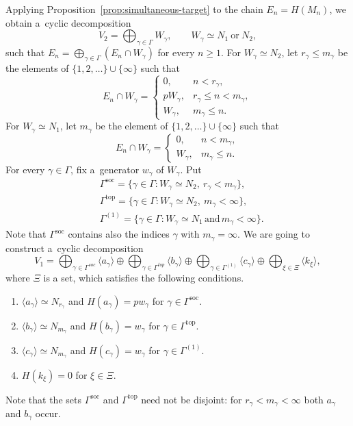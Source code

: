 \documentclass[11pt]{article}
\theoremstyle{definition}
\begin{document}
Applying Proposition~\ref{prop:simultaneous-target} to the chain
$E_n=H(M_n)$, we obtain a~cyclic decomposition
$$
V_2=\bigoplus_{\gamma\in\Gamma}W_\gamma,
\qquad W_\gamma\simeq N_1\ \text{or}\ N_2,
$$
such that $E_n=\bigoplus_{\gamma\in\Gamma}(E_n\cap W_\gamma)$
for every $n\geq1$.
For $W_\gamma\simeq N_2$, let $r_\gamma\leq m_\gamma$
be the elements of $\{1,2,\dots\}\cup\{\infty\}$ such that
$$
E_n\cap W_\gamma=
\begin{cases}
	0,&n<r_\gamma,\\
	pW_\gamma,&r_\gamma\leq n<m_\gamma,\\
	W_\gamma,&m_\gamma\leq n.
\end{cases}
$$
For $W_\gamma\simeq N_1$, let $m_\gamma$ be the element of $\{1,2,\dots\}\cup\{\infty\}$
such that
$$
E_n\cap W_\gamma=
\begin{cases}
	0,&n<m_\gamma,\\
	W_\gamma,&m_\gamma\leq n.
\end{cases}
$$
For every $\gamma\in\Gamma$, fix a~generator $w_\gamma$
of $W_\gamma$. Put
$$
\begin{aligned}
	&\Gamma^{\mathrm{soc}}
	=\{\gamma\in\Gamma:
	W_\gamma\simeq N_2,\ r_\gamma<m_\gamma\},\\
	& \Gamma^{\mathrm{top}}
	=\{\gamma\in\Gamma:
	W_\gamma\simeq N_2,\ m_\gamma<\infty\},\\
	&\Gamma^{(1)}
	=\{\gamma\in\Gamma:
	W_\gamma\simeq N_1\,\text{and}\,m_{\gamma}<\infty\}.
\end{aligned}
$$
Note that $\Gamma^{\mathrm{soc}}$ contains also the indices
	$\gamma$ with $m_\gamma=\infty$. We are going to construct a~cyclic decomposition  
$$
V_1=\bigoplus_{\gamma\in\Gamma^{soc}}\langle a_{\gamma}\rangle\oplus \bigoplus_{\gamma\in\Gamma^{top}}\langle b_{\gamma}\rangle \oplus \bigoplus_{\gamma\in\Gamma^{(1)}}\langle c_{\gamma}\rangle\oplus \bigoplus_{\xi\in\Xi}\langle k_{\xi}\rangle,
$$
where $\Xi$ is a set, which satisfies the following conditions.

\begin{enumerate}
\item[(i)] $\langle a_{\gamma}\rangle \simeq N_{r_{\gamma}}$ and $H(a_{\gamma})=pw_{\gamma}$ for $\gamma\in \Gamma^{\mathrm{soc}}$. 
\item[(ii)] $\langle b_{\gamma}\rangle \simeq N_{m_{\gamma}}$ and $H(b_{\gamma})=w_{\gamma}$ for $\gamma\in \Gamma^{\mathrm{top}}$. 
\item[(iii)] $\langle c_{\gamma}\rangle \simeq N_{m_{\gamma}}$ and $H(c_{\gamma})=w_{\gamma}$ for $\gamma\in \Gamma^{\mathrm{(1)}}$. 
\item[(iv)] $H(k_\xi)=0$ for $\xi\in\Xi$.
\end{enumerate}
Note that the sets $\Gamma^{\mathrm{soc}}$ and
	$\Gamma^{\mathrm{top}}$ need not be disjoint: for $r_\gamma<m_\gamma<\infty$ both
	$a_\gamma$ and $b_\gamma$ occur.
	
\end{document}

